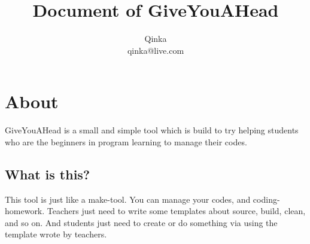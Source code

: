\documentclass[UTF8]{article} %
\title{Document of GiveYouAHead}
\author{Qinka\\qinka@live.com}
\begin{document}
\maketitle
\newpage
\tableofcontents
\newpage
\section{About}
GiveYouAHead is a small and simple tool which is build to try helping students who are the beginners in program learning to manage their codes.
\subsection{What is this?}
This tool is just like a make-tool. You can manage your codes, and coding-homework. Teachers just need to write some templates about source, build, clean, and so on. And students just need to create or do something via using the template wrote by teachers. 
\end{document}
